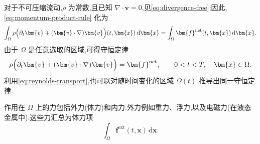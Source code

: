 \begin{note}[线动量守恒]
对于不可压缩流动,$\rho$ 为常数,且已知 $\nabla\cdot\bm{v}=0$,见\cref{eq:divergence-free};因此,\cref{eq:momentum-product-rule} 化为
\begin{equation*}
  \int_{\Omega}\rho\Bigl(\partial_t\bm{v}
    +(\bm{v}\cdot\nabla)\bm{v}\Bigr)(t,\bm{x})\,\mathrm{d}\bm{x}
  =\int_{\Omega}\bm{f}^{\mathrm{net}}(t,\bm{x})\,\mathrm{d}\bm{x}.
\end{equation*}
由于 $\Omega$ 是任意选取的区域,可得守恒定律
\begin{equation*}
  \rho\Bigl(\partial_t\bm{v}+(\bm{v}\cdot\nabla)\bm{v}\Bigr)
  =\bm{f}^{\mathrm{net}},
  \qquad 0<t<T,\quad\bm{x}\in\Omega.
\end{equation*}
利用\cref{eq:reynolds-transport},也可以对随时间变化的区域 $\Omega(t)$ 推导出同一守恒定律.
\end{note}

\begin{note}[外力]\label{note:external-forces}
作用在 $\Omega$ 上的力包括外力(体力)和内力.外力例如重力、浮力,以及电磁力(在液态金属中).这些力汇总为体力项
\begin{equation*}
  \int_{\Omega}\bm{f}^{\mathrm{ext}}(t,\bm{x})\,\mathrm{d}\bm{x}.
\end{equation*}
\end{note}

